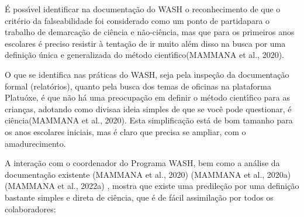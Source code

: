 \documentclass[
12pt,		%
openright,	%
twoside,  %
a4paper,			%
chapter=TITLE,		%
english,			%
french,				%
spanish,			%
brazil				%
]{USPSC-classe/USPSC}
\begin{document}
\noindent\begin{center}\mbox{\centering{}}\end{center}


\'E poss\'{\i}vel identificar na documenta\c{c}\~ao do WASH o reconhecimento de que o crit\'erio da falseabilidade foi considerado como um \textquotedbl ponto de partida\textquotedbl  para o trabalho de \textquotedbl demarca\c{c}\~ao de ci\^encia e n\~ao-ci\^encia\textquotedbl , mas que para \textquotedbl os primeiros anos escolares \'e preciso resistir \`a tenta\c{c}\~ao de ir muito al\'em disso na busca por uma defini\c{c}\~ao \'unica e generalizada do m\'etodo cient\'{\i}fico\textquotedbl   (MAMMANA et al., 2020).




O que se identifica nas pr\'aticas do WASH, seja pela inspe\c{c}\~ao da documenta\c{c}\~ao formal (relat\'orios), quanto pela busca dos temas de oficinas na plataforma \textquotedbl Platu\'oxe\textquotedbl , \'e que n\~ao h\'a uma preocupa\c{c}\~ao em definir o m\'etodo cient\'{\i}fico para as crian\c{c}as, adotando como \textquotedbl divisa\textquotedbl  a ideia simples de que \textquotedbl se voc\^e pode questionar, \'e ci\^encia\textquotedbl   (MAMMANA et al., 2020). Esta simplifica\c{c}\~ao est\'a de bom tamanho para os anos escolares iniciais, mas \'e claro que precisa se ampliar, com o amadurecimento.




A intera\c{c}\~ao com o coordenador do Programa WASH, bem como a an\'alise da documenta\c{c}\~ao existente  (MAMMANA et al., 2020)  (MAMMANA et al., 2020a)  (MAMMANA et al., 2022a) , mostra que existe uma predile\c{c}\~ao por uma defini\c{c}\~ao bastante simples e direta de ci\^encia, que \'e de f\'acil assimila\c{c}\~ao por todos os colaboradores:





\noindent\begin{center}\mbox{\centering{}}\end{center}
\end{document}
